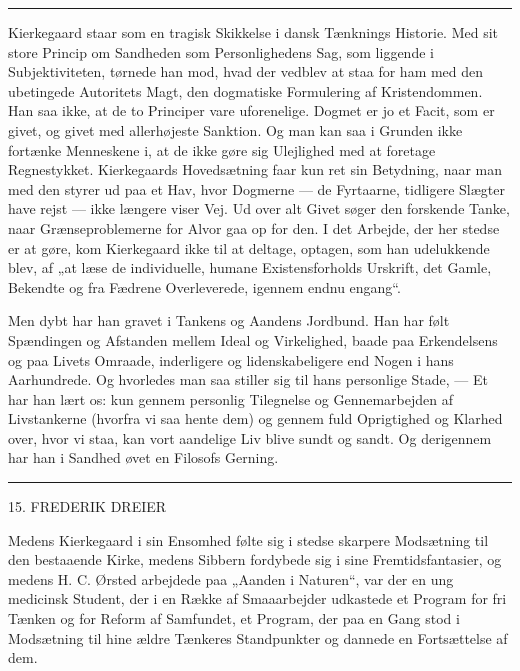 \documentclass[12pt,a4paper,openany]{book}
\newcommand{\opage}[1]{\marginnote{\footnotesize\textit{[#1]}}}
\begin{document}
\begin{center}\rule{2cm}{0.4pt}\end{center}

Kierkegaard staar som en tragisk Skikkelse i dansk Tænknings Historie. Med sit
store Princip om Sandheden som Personlighedens Sag, som liggende i
Subjektiviteten, tørnede han
\setcounter{footnote}{0}%
\opage{174}mod, hvad der vedblev at staa for ham med den ubetingede Autoritets
Magt, den dogmatiske Formulering af Kristendommen. Han saa ikke, at de to
Principer vare uforenelige. Dogmet er jo et Facit, som er givet, og givet med
allerhøjeste Sanktion. Og man kan saa i Grunden ikke fortænke Menneskene i, at
de ikke gøre sig Ulejlighed med at foretage Regnestykket. Kierkegaards
Hovedsætning faar kun ret sin Betydning, naar man med den styrer ud paa et Hav,
hvor Dogmerne --- de Fyrtaarne, tidligere Slægter have rejst --- ikke længere
viser Vej. Ud over alt Givet søger den forskende Tanke, naar Grænseproblemerne
for Alvor gaa op for den. I det Arbejde, der her stedse er at gøre, kom
Kierkegaard ikke til at deltage, optagen, som han udelukkende blev, af „at læse
de individuelle, humane Existensforholds Urskrift, det Gamle, Bekendte og fra
Fædrene Overleverede, igennem endnu engang“.

Men dybt har han gravet i Tankens og Aandens Jordbund. Han har følt Spændingen
og Afstanden mellem Ideal og Virkelighed, baade paa Erkendelsens og paa Livets
Omraade, inderligere og lidenskabeligere end Nogen i hans Aarhundrede. Og
hvorledes man saa stiller sig til hans personlige Stade, --- Et har han lært
os: kun gennem personlig Tilegnelse og Gennemarbejden af Livstankerne (hvorfra
vi saa hente dem) og gennem fuld Oprigtighed og Klarhed over, hvor vi staa, kan
vort aandelige Liv blive sundt og sandt. Og derigennem har han i Sandhed øvet
en Filosofs Gerning.

\begin{center}\rule{2cm}{0.4pt}\end{center}

\setcounter{footnote}{0}%
\opage{175}

\begin{center}\large 15. FREDERIK DREIER\end{center}

Medens Kierkegaard i sin Ensomhed følte sig i stedse skarpere Modsætning til
den bestaaende Kirke, medens Sibbern fordybede sig i sine Fremtidsfantasier, og
medens H. C. Ørsted arbejdede paa „Aanden i Naturen“, var der en ung medicinsk
Student, der i en Række af Smaaarbejder udkastede et Program for fri Tænken og
for Reform af Samfundet, et Program, der paa en Gang stod i Modsætning til hine
ældre Tænkeres Standpunkter og dannede en Fortsættelse af dem.
\end{document}
